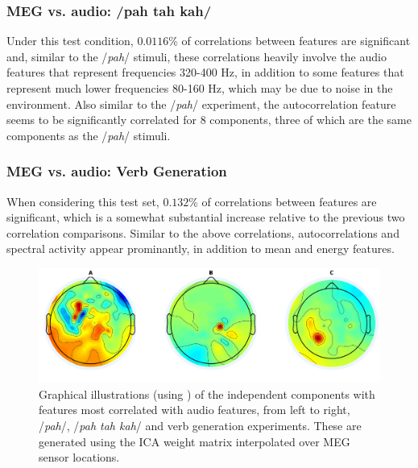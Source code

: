 \documentclass[utf8]{frontiersSCNS} %
\begin{document}
\subsubsection{MEG vs. audio: /pah tah kah/}

Under this test condition, $0.0116$\% of correlations between features are significant and, similar to the /{\em pah}/ stimuli, these correlations heavily involve the audio features that represent frequencies 320-400 Hz, in addition to some features that represent much lower frequencies 80-160 Hz, which may be due to noise in the environment. Also similar to the /{\em pah}/ experiment, the autocorrelation feature seems to be significantly correlated for 8 components, three of which are the same components as the /{\em pah}/ stimuli.


\subsubsection{MEG vs. audio: Verb Generation}

When considering this test set, $0.132$\% of correlations between features are significant, which is a somewhat substantial increase relative to the previous two correlation comparisons. Similar to the above correlations, autocorrelations and spectral activity appear prominantly, in addition to mean and energy features. 

\begin{figure}[t]
  \centering
  \includegraphics[width=\linewidth]{AllComponents.png}
  \caption{Graphical illustrations (using \cite{Delorme04eeglab}) of the independent components with features most correlated with audio features, from left to right, /{\em pah}/, /{\em pah tah kah}/ and verb generation experiments. These are generated using the ICA weight matrix interpolated over MEG sensor locations. }
  \label{fig:components}
\end{figure}
 
\end{document}
